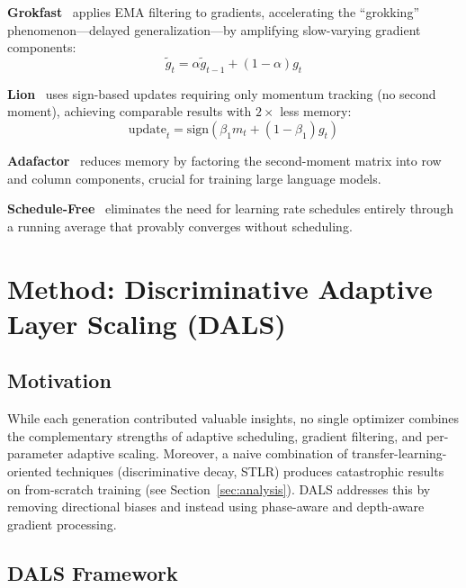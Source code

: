 \documentclass[a4paper,fleqn]{cas-dc}
\begin{document}
\textbf{Grokfast}~\citet{lee2024grokfast} applies EMA filtering to gradients, accelerating the ``grokking'' phenomenon---delayed generalization---by amplifying slow-varying gradient components:
\begin{equation}\label{eq:grokfast}
\tilde{g}_t = \alpha \tilde{g}_{t-1} + (1-\alpha) g_t
\end{equation}

\textbf{Lion}~\citet{chen2023symbolic} uses sign-based updates requiring only momentum tracking (no second moment), achieving comparable results with $2\times$ less memory:
\begin{equation}\label{eq:lion}
\text{update}_t = \text{sign}(\beta_1 m_t + (1-\beta_1) g_t)
\end{equation}

\textbf{Adafactor}~\citet{shazeer2018adafactor} reduces memory by factoring the second-moment matrix into row and column components, crucial for training large language models.

\textbf{Schedule-Free}~\citet{defazio2024schedulefree} eliminates the need for learning rate schedules entirely through a running average that provably converges without scheduling.

\section{Method: Discriminative Adaptive Layer Scaling (DALS)}\label{sec:method}

\subsection{Motivation}

While each generation contributed valuable insights, no single optimizer combines the complementary strengths of adaptive scheduling, gradient filtering, and per-parameter adaptive scaling. Moreover, a naive combination of transfer-learning-oriented techniques (discriminative decay, STLR) produces catastrophic results on from-scratch training (see Section~\ref{sec:analysis}). DALS addresses this by removing directional biases and instead using phase-aware and depth-aware gradient processing.

\subsection{DALS Framework}
\end{document}
